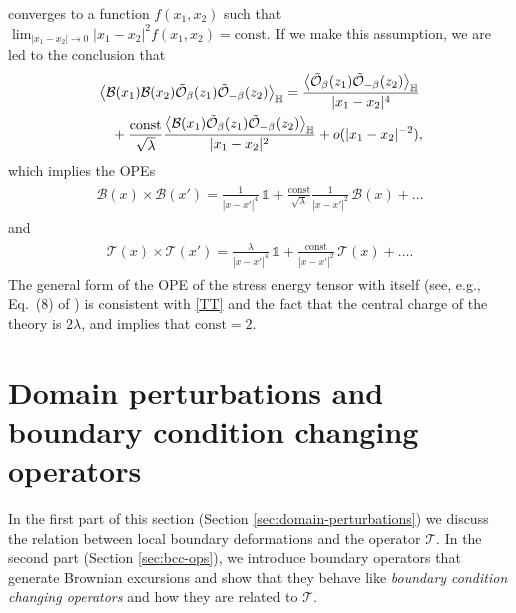 \documentclass[a4paper,11pt]{article}
\begin{document}
converges to a function $f(x_1,x_2)$ such that $\lim_{|x_1-x_2| \to 0} |x_1-x_2|^2 f(x_1,x_2) = \text{const}$. If we make this assumption, we are led to the conclusion that
\begin{align}
\begin{split}
    & \Braket{ \mathcal{B}(x_1) \mathcal{B}(x_2) \tilde{\mathcal{O}}_{\beta}(z_1) \tilde{\mathcal{O}}_{-\beta}(z_2) }_{\mathbb{H}} = \frac{\Braket{\tilde{\mathcal{O}}_{\beta}(z_1) \tilde{\mathcal{O}}_{-\beta}(z_2)}_{\mathbb{H}}}{|x_1-x_2|^{4}} \\
    & \quad + \frac{\text{const}}{\sqrt{\lambda}} \frac{\Braket{ \mathcal{B}(x_1) \tilde{\mathcal{O}}_{\beta}(z_1) \tilde{\mathcal{O}}_{-\beta}(z_2) }_{\mathbb{H}}}{|x_1-x_2|^2} + o(|x_1-x_2|^{-2}),
\end{split}
\end{align}
which implies the OPEs
\begin{align}
\begin{split}
    \mathcal{B}(x) \times \mathcal{B}(x') = \frac{1}{|x-x'|^{4}} \, \mathbb{1} + \frac{\text{const}}{\sqrt{\lambda}} \frac{1}{|x-x'|^2} \, \mathcal{B}(x) + \ldots
\end{split}
\end{align}
and
\begin{align}
\begin{split} \label{TT}
    \mathcal{T}(x) \times \mathcal{T}(x') = \frac{\lambda}{|x-x'|^{4}} \, \mathbb{1} + \frac{\text{const}}{|x-x'|^2} \, \mathcal{T}(x) + \ldots .
\end{split}
\end{align}
The general form of the OPE of the stress energy tensor with itself (see, e.g., Eq.\ (8) of \cite{CARDY2006333}) is consistent with \eqref{TT} and the fact that the central charge of the theory is $2\lambda$, and implies that $\text{const}=2$.


\section{Domain perturbations and boundary condition changing operators} \label{sec:domain-perturbations_bc-ops}

In the first part of this section (Section \ref{sec:domain-perturbations}) we discuss the relation between local boundary deformations and the operator $\mathcal{T}$. In the second part (Section \ref{sec:bcc-ops}), we introduce boundary operators that generate Brownian excursions and show that they behave like \emph{boundary condition changing operators} and how they are related to $\mathcal{T}$.
\end{document}

